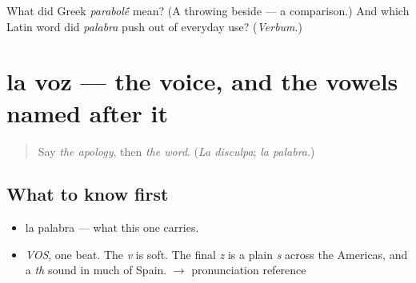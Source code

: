 \begin{tcolorbox}[breakable,colback=teal!4,colframe=teal!35!black,title={Before you move on}]
What did Greek \emph{parabol\'{\={e}}} mean? (A throwing beside — a comparison.) And which Latin word did \emph{palabra} push out of everyday use? (\emph{Verbum}.)
\end{tcolorbox}
\section[la voz]{la voz — the voice, and the vowels named after it}

\label{lesson:ES-C332-voz}



\begin{quote}
Say \emph{the apology}, then \emph{the word}. (\emph{La disculpa}; \emph{la palabra}.)
\end{quote}

\subsection*{What to know first}
\begin{itemize}
\raggedright
  \item la palabra — what this one carries.
\end{itemize}

\begin{sounds}
\begin{itemize}
\raggedright
  \item \emph{VOS}, one beat. The \emph{v} is soft. The final \emph{z} is a plain \emph{s} across the Americas, and a \emph{th} sound in much of Spain. $\to$ pronunciation reference
\end{itemize}
\end{sounds}

